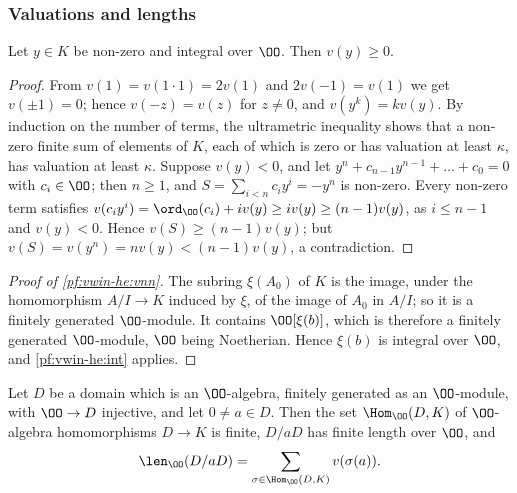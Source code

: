 \subsubsection{Valuations and lengths}\label{sec:pf:vwin-he:pf-val}

\begin{lemma}\label{pf:vwin-he:int}
Let $y\in K$ be non-zero and integral over $\OO$. Then $v(y)\ge0$.
\end{lemma}

\begin{proof}
From $v(1)=v(1\cdot1)=2v(1)$ and $2v(-1)=v(1)$ we get $v(\pm1)=0$; hence $v(-z)=v(z)$ for $z\ne0$, and
$v(y^k)=kv(y)$. By induction on the number of terms, the ultrametric inequality shows that a non-zero finite sum of
elements of $K$, each of which is zero or has valuation at least $\kappa$, has valuation at least $\kappa$. Suppose
$v(y)<0$, and let $y^n+c_{n-1}y^{n-1}+\dots+c_0=0$ with $c_i\in\OO$; then $n\ge1$, and $S=\sum_{i<n}c_iy^i=-y^n$ is
non-zero. Every non-zero term satisfies $v(c_iy^i)=\ord_\OO(c_i)+iv(y)\ge iv(y)\ge(n-1)v(y)$, as $i\le n-1$ and
$v(y)<0$. Hence $v(S)\ge(n-1)v(y)$; but $v(S)=v(y^n)=nv(y)<(n-1)v(y)$, a contradiction.
\end{proof}

\begin{proof}[Proof of \cref{pf:vwin-he:vnn}]
The subring $\xi(A_0)$ of $K$ is the image, under the homomorphism $A/I\to K$ induced by $\xi$, of the image of
$A_0$ in $A/I$; so it is a finitely generated $\OO$-module. It contains $\OO[\xi(b)]$, which is therefore a finitely
generated $\OO$-module, $\OO$ being Noetherian. Hence $\xi(b)$ is integral over $\OO$, and \cref{pf:vwin-he:int}
applies.
\end{proof}

\begin{lemma}\label{pf:vwin-he:lqs}
Let $D$ be a domain which is an $\OO$-algebra, finitely generated as an $\OO$-module, with $\OO\to D$ injective, and
let $0\ne a\in D$. Then the set $\Hom_\OO(D,K)$ of $\OO$-algebra homomorphisms $D\to K$ is finite, $D/aD$ has finite
length over $\OO$, and
\[
 \len_\OO(D/aD)=\sum_{\sigma\in\Hom_\OO(D,K)}v(\sigma(a)).
\]
\end{lemma}

